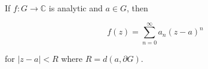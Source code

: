 If $f: G \to \mathbb{C}$ is analytic and $a \in G$, then

$$f(z) = \sum_{n=0}^{\infty} a_n (z - a)^n$$

for $|z - a| < R$ where $R = d(a, \partial G)$.
